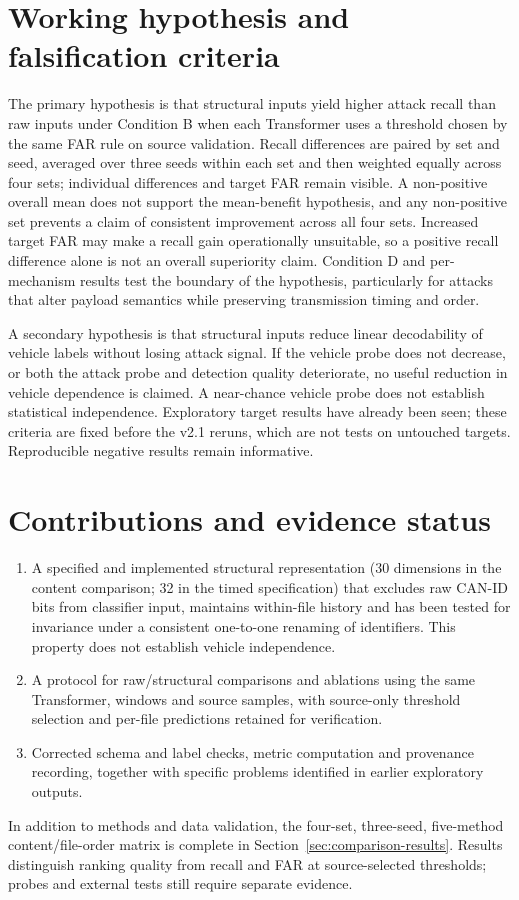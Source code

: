 \documentclass[12pt,a4paper,oneside,openany]{extbook}
\begin{document}
\section{Working hypothesis and falsification criteria}
The primary hypothesis is that structural inputs yield higher attack recall than raw inputs under Condition B when each Transformer uses a threshold chosen by the same FAR rule on source validation. Recall differences are paired by set and seed, averaged over three seeds within each set and then weighted equally across four sets; individual differences and target FAR remain visible. A non-positive overall mean does not support the mean-benefit hypothesis, and any non-positive set prevents a claim of consistent improvement across all four sets. Increased target FAR may make a recall gain operationally unsuitable, so a positive recall difference alone is not an overall superiority claim. Condition D and per-mechanism results test the boundary of the hypothesis, particularly for attacks that alter payload semantics while preserving transmission timing and order.

A secondary hypothesis is that structural inputs reduce linear decodability of vehicle labels without losing attack signal. If the vehicle probe does not decrease, or both the attack probe and detection quality deteriorate, no useful reduction in vehicle dependence is claimed. A near-chance vehicle probe does not establish statistical independence. Exploratory target results have already been seen; these criteria are fixed before the v2.1 reruns, which are not tests on untouched targets. Reproducible negative results remain informative.

\section{Contributions and evidence status}
\begin{enumerate}
\item A specified and implemented structural representation (30 dimensions in the content comparison; 32 in the timed specification) that excludes raw CAN-ID bits from classifier input, maintains within-file history and has been tested for invariance under a consistent one-to-one renaming of identifiers. This property does not establish vehicle independence.
\item A protocol for raw/structural comparisons and ablations using the same Transformer, windows and source samples, with source-only threshold selection and per-file predictions retained for verification.
\item Corrected schema and label checks, metric computation and provenance recording, together with specific problems identified in earlier exploratory outputs.
\end{enumerate}
In addition to methods and data validation, the four-set, three-seed, five-method content/file-order matrix is complete in Section~\ref{sec:comparison-results}. Results distinguish ranking quality from recall and FAR at source-selected thresholds; probes and external tests still require separate evidence.
\end{document}

